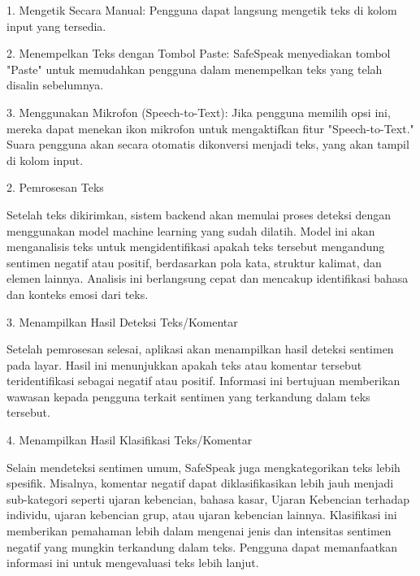 \documentclass[journal,article,submit,pdftex,moreauthors]{Definitions/mdpi}
\begin{document}
\item \hspace{1cm}1. Mengetik Secara Manual: Pengguna dapat langsung mengetik teks di kolom input yang tersedia.
\item \hspace{1cm}2. Menempelkan Teks dengan Tombol Paste: SafeSpeak menyediakan tombol "Paste" untuk memudahkan pengguna dalam menempelkan teks yang telah disalin sebelumnya.
\item \hspace{1cm}3. Menggunakan Mikrofon (Speech-to-Text): Jika pengguna memilih opsi ini, mereka dapat menekan ikon mikrofon untuk mengaktifkan fitur "Speech-to-Text." Suara pengguna akan secara otomatis dikonversi menjadi teks, yang akan tampil di kolom input.

\item 2. Pemrosesan Teks


Setelah teks dikirimkan, sistem backend akan memulai proses deteksi dengan menggunakan model machine learning yang sudah dilatih. Model ini akan menganalisis teks untuk mengidentifikasi apakah teks tersebut mengandung sentimen negatif atau positif, berdasarkan pola kata, struktur kalimat, dan elemen lainnya. Analisis ini berlangsung cepat dan mencakup identifikasi bahasa dan konteks emosi dari teks.

\item 3. Menampilkan Hasil Deteksi Teks/Komentar

Setelah pemrosesan selesai, aplikasi akan menampilkan hasil deteksi sentimen pada layar. Hasil ini menunjukkan apakah teks atau komentar tersebut teridentifikasi sebagai negatif atau positif. Informasi ini bertujuan memberikan wawasan kepada pengguna terkait sentimen yang terkandung dalam teks tersebut.

\item 4. Menampilkan Hasil Klasifikasi Teks/Komentar

Selain mendeteksi sentimen umum, SafeSpeak juga mengkategorikan teks lebih spesifik. Misalnya, komentar negatif dapat diklasifikasikan lebih jauh menjadi sub-kategori seperti ujaran kebencian, bahasa kasar, Ujaran Kebencian terhadap individu, ujaran kebencian grup, atau ujaran kebencian lainnya. Klasifikasi ini memberikan pemahaman lebih dalam mengenai jenis dan intensitas sentimen negatif yang mungkin terkandung dalam teks. Pengguna dapat memanfaatkan informasi ini untuk mengevaluasi teks lebih lanjut.


\begin{quote}
\end{quote}
\end{document}
